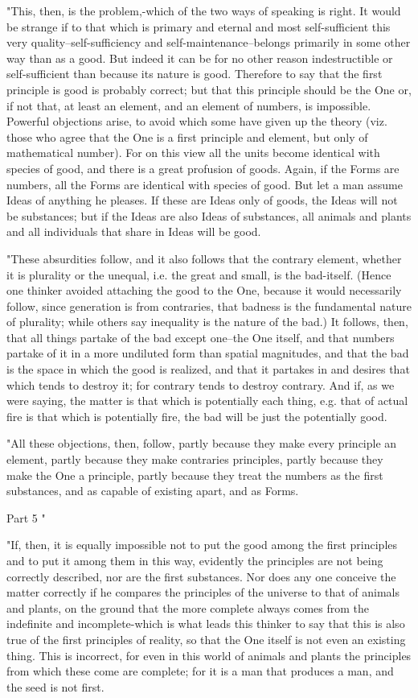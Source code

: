 "This, then, is the problem,-which of the two ways of speaking is
right. It would be strange if to that which is primary and eternal
and most self-sufficient this very quality--self-sufficiency and self-maintenance--belongs
primarily in some other way than as a good. But indeed it can be for
no other reason indestructible or self-sufficient than because its
nature is good. Therefore to say that the first principle is good
is probably correct; but that this principle should be the One or,
if not that, at least an element, and an element of numbers, is impossible.
Powerful objections arise, to avoid which some have given up the theory
(viz. those who agree that the One is a first principle and element,
but only of mathematical number). For on this view all the units become
identical with species of good, and there is a great profusion of
goods. Again, if the Forms are numbers, all the Forms are identical
with species of good. But let a man assume Ideas of anything he pleases.
If these are Ideas only of goods, the Ideas will not be substances;
but if the Ideas are also Ideas of substances, all animals and plants
and all individuals that share in Ideas will be good. 

"These absurdities follow, and it also follows that the contrary element,
whether it is plurality or the unequal, i.e. the great and small,
is the bad-itself. (Hence one thinker avoided attaching the good to
the One, because it would necessarily follow, since generation is
from contraries, that badness is the fundamental nature of plurality;
while others say inequality is the nature of the bad.) It follows,
then, that all things partake of the bad except one--the One itself,
and that numbers partake of it in a more undiluted form than spatial
magnitudes, and that the bad is the space in which the good is realized,
and that it partakes in and desires that which tends to destroy it;
for contrary tends to destroy contrary. And if, as we were saying,
the matter is that which is potentially each thing, e.g. that of actual
fire is that which is potentially fire, the bad will be just the potentially
good. 

"All these objections, then, follow, partly because they make every
principle an element, partly because they make contraries principles,
partly because they make the One a principle, partly because they
treat the numbers as the first substances, and as capable of existing
apart, and as Forms. 

Part 5 "

"If, then, it is equally impossible not to put the good among the
first principles and to put it among them in this way, evidently the
principles are not being correctly described, nor are the first substances.
Nor does any one conceive the matter correctly if he compares the
principles of the universe to that of animals and plants, on the ground
that the more complete always comes from the indefinite and incomplete-which
is what leads this thinker to say that this is also true of the first
principles of reality, so that the One itself is not even an existing
thing. This is incorrect, for even in this world of animals and plants
the principles from which these come are complete; for it is a man
that produces a man, and the seed is not first. 

